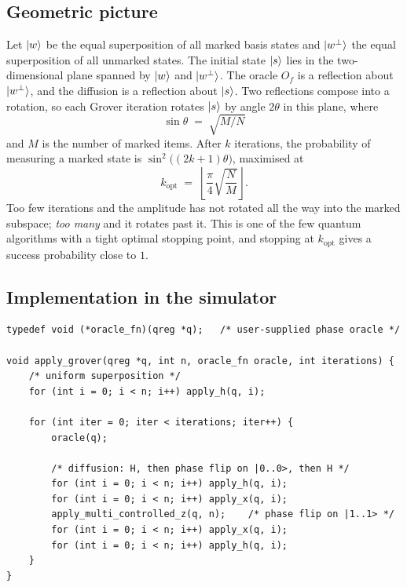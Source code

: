 \subsection{Geometric picture}

Let $\mathinner{|{w}\rangle}$ be the equal superposition of all marked basis states and $\mathinner{|{w^\perp}\rangle}$ the equal superposition of all unmarked states. The initial state $\mathinner{|{s}\rangle}$ lies in the two-dimensional plane spanned by $\mathinner{|{w}\rangle}$ and $\mathinner{|{w^\perp}\rangle}$. The oracle $O_f$ is a reflection about $\mathinner{|{w^\perp}\rangle}$, and the diffusion is a reflection about $\mathinner{|{s}\rangle}$. Two reflections compose into a rotation, so each Grover iteration rotates $\mathinner{|{s}\rangle}$ by angle $2\theta$ in this plane, where
\begin{equation}
\sin\theta \;=\; \sqrt{M/N}
\end{equation}
and $M$ is the number of marked items. After $k$ iterations, the probability of measuring a marked state is $\sin^2\bigl((2k+1)\theta\bigr)$, maximised at
\begin{equation}
k_\mathrm{opt} \;=\; \left\lfloor \frac{\pi}{4}\sqrt{\frac{N}{M}} \right\rfloor.
\end{equation}
Too few iterations and the amplitude has not rotated all the way into the marked subspace; \emph{too many} and it rotates past it. This is one of the few quantum algorithms with a tight optimal stopping point, and stopping at $k_\mathrm{opt}$ gives a success probability close to $1$.

\subsection{Implementation in the simulator}

\begin{lstlisting}[caption={Grover's algorithm: uniform-superposition initialisation followed by $k$ iterations of oracle + diffusion.}]
typedef void (*oracle_fn)(qreg *q);   /* user-supplied phase oracle */

void apply_grover(qreg *q, int n, oracle_fn oracle, int iterations) {
    /* uniform superposition */
    for (int i = 0; i < n; i++) apply_h(q, i);

    for (int iter = 0; iter < iterations; iter++) {
        oracle(q);

        /* diffusion: H, then phase flip on |0..0>, then H */
        for (int i = 0; i < n; i++) apply_h(q, i);
        for (int i = 0; i < n; i++) apply_x(q, i);
        apply_multi_controlled_z(q, n);    /* phase flip on |1..1> */
        for (int i = 0; i < n; i++) apply_x(q, i);
        for (int i = 0; i < n; i++) apply_h(q, i);
    }
}
\end{lstlisting}

